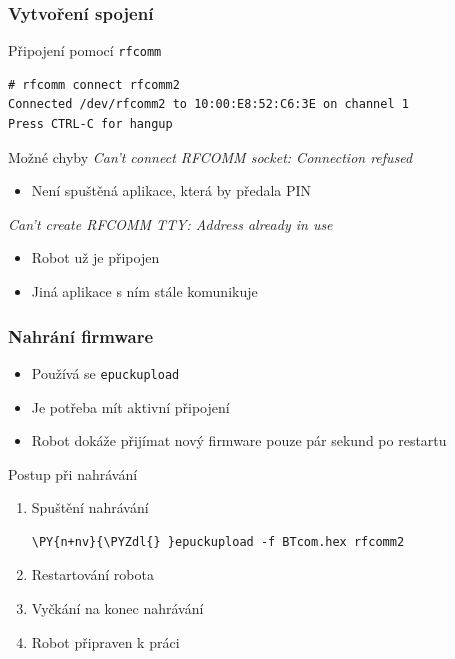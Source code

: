 \documentclass{beamer}
\begin{document}
\begin{frame}[fragile]
    \frametitle{Vytvoření spojení}
    \begin{block}{Připojení pomocí {\tt rfcomm}}
    \begin{Verbatim}[fontsize=\small]
# rfcomm connect rfcomm2
Connected /dev/rfcomm2 to 10:00:E8:52:C6:3E on channel 1
Press CTRL-C for hangup
    \end{Verbatim}
    \end{block}

    \begin{alertblock}{Možné chyby}
        {\em Can’t connect RFCOMM socket: Connection refused}
        \begin{itemize}
            \item Není spuštěná aplikace, která by předala PIN
        \end{itemize}
        {\em Can’t create RFCOMM TTY: Address already in use}
        \begin{itemize}
            \item Robot už je připojen
            \item Jiná aplikace s ním stále komunikuje
        \end{itemize}
    \end{alertblock}
\end{frame}

\begin{frame}[fragile]
    \frametitle{Nahrání firmware}
    \begin{itemize}
        \item Používá se {\tt epuckupload}
        \item Je potřeba mít aktivní připojení
        \item Robot dokáže přijímat nový firmware pouze pár sekund po restartu
    \end{itemize}
    \begin{block}{Postup při nahrávání}
        \begin{enumerate}
            \item Spuštění nahrávání
\begin{Verbatim}[commandchars=\\\{\}]
\PY{n+nv}{\PYZdl{} }epuckupload -f BTcom.hex rfcomm2
\end{Verbatim}
            \item Restartování robota
            \item Vyčkání na konec nahrávání
            \item Robot připraven k práci
        \end{enumerate}
    \end{block}

\end{frame}
\end{document}
